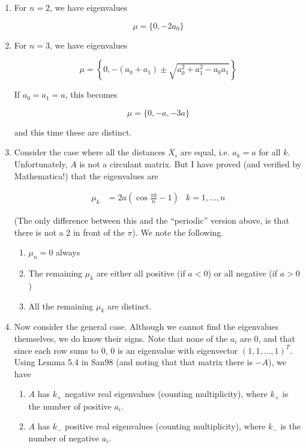 \documentclass[12pt]{article}
\begin{document}
\begin{enumerate}

\item For $n = 2$, we have eigenvalues

\[
\mu = \{ 0, -2 a_0 \}
\]

\item For $n = 3$, we have eigenvalues

\[
\mu = \left\{ 0,  -(a_0 + a_1) \pm 
\sqrt{a_0^2 + a_1^2 - a_0 a_1} \right\}
\]

If $a_0 = a_1 = a$, this becomes

\[
\mu = \{0,  -a, -3a \}
\]

and this time these are distinct.

\item Consider the case where all the distances $X_i$ are equal, i.e. $a_k = a$ for all $k$. Unfortunately, $A$ is not a circulant matrix. But I have proved (and verified by Mathematica!) that the eigenvalues are 

\begin{align*}
\mu_k &= 2 a\left( \cos \frac{\pi k}{n}  - 1 \right) & k = 1, \dots, n
\end{align*}

(The only difference between this and the ``periodic'' version above, is that there is not a 2 in front of the $\pi$). We note the following.

\begin{enumerate}
	\item $\mu_n = 0$ always
	\item The remaining $\mu_k$ are either all positive (if $a < 0$) or all negative (if $a > 0$)
	\item All the remaining $\mu_k$ are distinct. 
\end{enumerate}

\item Now consider the general case. Although we cannot find the eigenvalues themselves, we do know their signs. Note that none of the $a_i$ are 0, and that since each row sums to 0, 0 is an eigenvalue with eigenvector $(1, 1, \dots, 1)^T$. Using Lemma 5.4 in San98 (and noting that that matrix there is $-A$), we have

\begin{enumerate}
	\item $A$ has $k_+$ negative real eigenvalues (counting multiplicity), where $k_+$ is the number of positive $a_i$.
	\item $A$ has $k_-$ positive real eigenvalues (counting multiplicity), where $k_-$ is the number of negative $a_i$.
\end{enumerate}

\end{enumerate}
\end{document}

